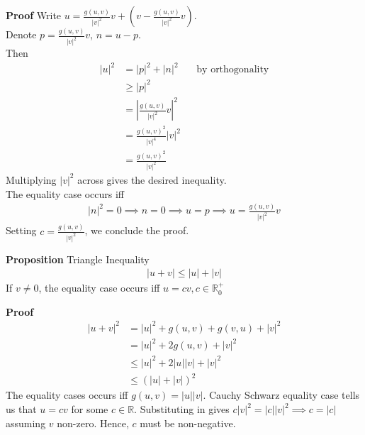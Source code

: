 \documentclass{article}
\begin{document}
\textbf{Proof}
Write $u = \frac{g(u,v)}{|v|^2}v + (v-\frac{g(u,v)}{|v|^2}v)$.\\
Denote $p=\frac{g(u,v)}{|v|^2}v$, $n=u-p$.\\
Then
\begin{align*}
	|u|^2 &= |p|^2 + |n|^2 &&\text{by orthogonality}\\
	&\geq |p|^2\\
	&= \left\lvert \frac{g(u,v)}{|v|^2}v \right\rvert^2 \\
	&= \frac{g(u,v)^2}{|v|^4} |v|^2\\
	&= \frac{g(u,v)^2}{|v|^2}
\end{align*}
Multiplying $|v|^2$ across gives the desired inequality.\\
The equality case occurs iff
\begin{align*}
	|n|^2=0 \implies n=0\implies u=p \implies u = \frac{g(u,v)}{|v|^2}v
\end{align*}
Setting $c=\frac{g(u,v)}{|v|^2}$, we conclude the proof.

\textbf{Proposition} Triangle Inequality
\begin{align*}
	|u+v| \leq |u| + |v|
\end{align*}
If $v\neq 0$, the equality case occurs iff $u=cv, c\in \mathbb{R}^+_0$

\textbf{Proof}
\begin{align*}
	|u+v|^2 &= |u|^2 + g(u,v) + g(v,u) + |v|^2\\
	&= |u|^2 + 2g(u,v) + |v|^2\\
	&\leq |u|^2 + 2|u||v| + |v|^2\\
	&\leq (|u| + |v|)^2
\end{align*}
The equality cases occurs iff $g(u,v)=|u||v|$. Cauchy Schwarz equality case tells us that $u=cv$ for some $c\in \mathbb{R}$. Substituting in gives $c|v|^2=|c||v|^2\implies c=|c|$ assuming $v$ non-zero. Hence, $c$ must be non-negative.
\end{document}

